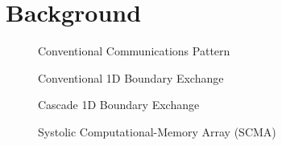 \section{Background}

\begin{figure}
  \centering
  
  \caption{Conventional Communications Pattern}
  \label{fig:convcomms}
\end{figure}

\begin{figure}
  \centering
  
  \caption{Conventional 1D Boundary Exchange}
  \label{fig:exch1d}
\end{figure}

\begin{figure}
  \centering
  
  \caption{Cascade 1D Boundary Exchange}
  \label{fig:trans1d}
\end{figure}

\begin{figure}
  \centering
  
  \caption{Systolic Computational-Memory Array (SCMA)}
  \label{fig:scma}
\end{figure}
